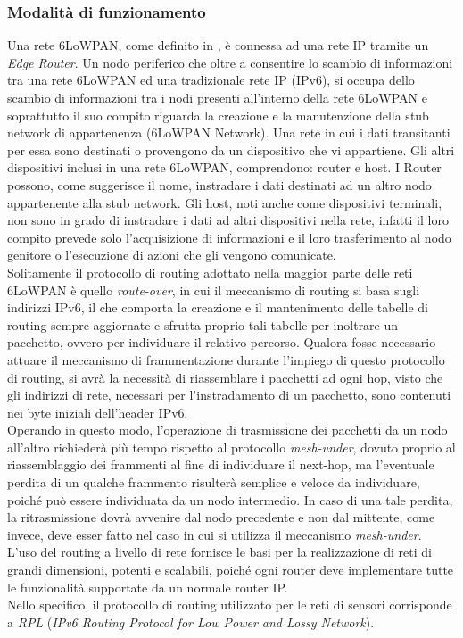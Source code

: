 \subsubsection{Modalità di funzionamento}
Una rete 6LoWPAN, come definito in \cite{olsson20146lowpan}, è connessa ad una rete IP tramite un \textit{Edge Router}. 
Un nodo periferico che oltre a consentire lo scambio di informazioni tra una rete 6LoWPAN ed una tradizionale rete IP (IPv6), si occupa dello scambio di informazioni tra i nodi presenti all'interno della rete 6LoWPAN e soprattutto il suo compito riguarda la creazione e la manutenzione della stub network di appartenenza (6LoWPAN Network). Una rete in cui i dati transitanti per essa sono destinati o provengono da un dispositivo che vi appartiene. Gli altri dispositivi inclusi in una rete 6LoWPAN, comprendono: router e host. I Router possono, come suggerisce il nome, instradare i dati destinati ad un altro nodo appartenente alla stub network. Gli host, noti anche come dispositivi terminali, non sono in grado di instradare i dati ad altri dispositivi nella rete, infatti il loro compito prevede solo l'acquisizione di informazioni e il loro trasferimento al nodo genitore o l'esecuzione di azioni che gli vengono comunicate.\\

\noindent Solitamente il protocollo di routing adottato nella maggior parte delle reti 6LoWPAN è quello \textit{route-over}, in cui il meccanismo di routing si basa sugli indirizzi IPv6, il che comporta la creazione e il mantenimento delle tabelle di routing sempre aggiornate e sfrutta proprio tali tabelle per inoltrare un pacchetto, ovvero per individuare il relativo percorso.
Qualora fosse necessario attuare il meccanismo di frammentazione durante l'impiego di questo protocollo di routing, si avrà la necessità di riassemblare i pacchetti ad ogni hop, visto che gli indirizzi di rete, necessari per l'instradamento di un pacchetto, sono contenuti nei byte iniziali dell'header IPv6.\\
Operando in questo modo, l'operazione di trasmissione dei pacchetti da un nodo all'altro richiederà più tempo rispetto al protocollo \textit{mesh-under}, dovuto proprio al riassemblaggio dei frammenti al fine di individuare il next-hop, ma l'eventuale perdita di un qualche frammento risulterà semplice e veloce da individuare, poiché può essere individuata da un nodo intermedio. 
In caso di una tale perdita, la ritrasmissione dovrà avvenire dal nodo precedente e non dal mittente, come invece, deve esser fatto nel caso in cui si utilizza il meccanismo \textit{mesh-under}.\\ 
L'uso del routing a livello di rete fornisce le basi per la realizzazione di reti di grandi dimensioni, potenti e scalabili, poiché ogni router deve implementare tutte le funzionalità supportate da un normale router IP. \\
Nello specifico, il protocollo di routing utilizzato per le reti di sensori corrisponde a \textit{RPL} (\textit{IPv6 Routing Protocol for Low Power and Lossy Network}).
